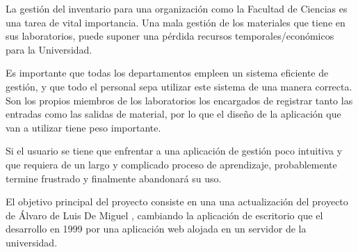 
La gestión del inventario para una organización como la Facultad de Ciencias es una tarea de vital importancia. Una mala gestión de los materiales que tiene en sus laboratorios, puede suponer una pérdida recursos temporales/económicos para la Universidad.

Es importante que todas los departamentos empleen un sistema eficiente de gestión, y que todo el personal sepa utilizar este sistema de una manera correcta. Son los propios miembros de los laboratorios los encargados de registrar tanto las entradas como las salidas de material, por lo que el diseño de la aplicación que van a utilizar tiene peso importante. 

Si el usuario se tiene que enfrentar a una aplicación de gestión poco intuitiva y que requiera de un largo y complicado proceso de aprendizaje, probablemente termine frustrado y finalmente abandonará su uso.

El objetivo principal del proyecto consiste en una una actualización del proyecto de Álvaro de Luis De Miguel \cite{proyecto:Geslab-1.0}, cambiando la aplicación de escritorio que el desarrollo en 1999 por una aplicación web alojada en un servidor de la universidad.